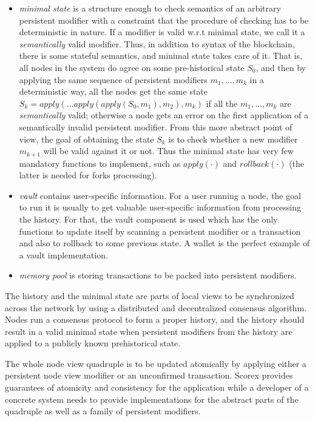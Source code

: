 \begin{itemize}
\item{\em minimal state} is a structure enough to check semantics of an arbitrary persistent modifier with a constraint that the procedure of checking has to be deterministic in nature. If a modifier is valid w.r.t minimal state, we call it a {\em semantically} valid modifier.
Thus, in addition to syntax of the blockchain, there is some stateful semantics, and minimal state takes care of it. That is, all nodes in the system do agree on some pre-historical state $S_0$, and then by applying the same sequence of persistent modifiers $m_1, \ldots, m_k$ in a deterministic way, all the nodes get the same state $S_k = apply(\ldots apply(apply(S_0, m_1), m_2), m_k)$ if all the $m_1, \ldots, m_k$ are {\em semantically} valid; otherwise a node gets an error on the first application of a semantically invalid persistent modifier. From this more abstract point of view, the goal of obtaining the state $S_k$ is to check whether a new modifier $m_{k+1}$ will be valid against it or not. Thus the minimal state has very few mandatory functions to implement, such as $apply(\cdot)$ and $rollback(\cdot)$ (the latter is needed for forks processing).

\item{\em vault} contains user-specific information. For a user running a node, the goal to run it is usually to get valuable user-specific information from processing the history. For that, the vault component is used which has the only functions to update itself by scanning a persistent modifier or a transaction and also to rollback to some previous state. A wallet is the perfect example of a vault implementation. 

\item{\em memory pool} is storing transactions to be packed into persistent modifiers.
\end{itemize}

The history and the minimal state are parts of local views to be synchronized across the network by using a distributed and decentralized consensus algorithm. Nodes run a consensus protocol to form a proper history, and the history should result in a valid minimal state when persistent modifiers from the history are applied to a publicly known prehistorical state.

The whole node view quadruple is to be updated atomically by applying either a persistent node view modifier or an unconfirmed transaction. Scorex provides guarantees of atomicity and consistency for the application while a developer of a concrete system needs to provide implementations for the abstract parts of the quadruple as well as a family of persistent modifiers.

